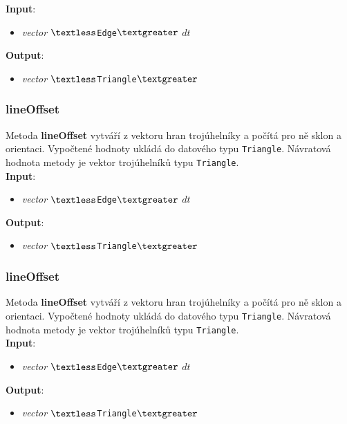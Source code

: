 \documentclass[a4paper, 12pt]{article}
\begin{document}
\textbf{Input}:
\begin{itemize}
\item \textsl{vector} $\textless$\texttt{Edge}$\textgreater$ $dt$
\end{itemize}

\textbf{Output}:
\begin{itemize}
\item \textsl{vector} $\textless$\texttt{Triangle}$\textgreater$
\end{itemize}

\subsubsection*{lineOffset}
Metoda \textbf{lineOffset} vytváří z vektoru hran trojúhelníky a počítá pro ně sklon a orientaci. Vypočtené hodnoty ukládá do datového typu \texttt{Triangle}. Návratová hodnota metody je vektor trojúhelníků typu \texttt{Triangle}.\\

\textbf{Input}:
\begin{itemize}
\item \textsl{vector} $\textless$\texttt{Edge}$\textgreater$ $dt$
\end{itemize}

\textbf{Output}:
\begin{itemize}
\item \textsl{vector} $\textless$\texttt{Triangle}$\textgreater$
\end{itemize}

\subsubsection*{lineOffset}
Metoda \textbf{lineOffset} vytváří z vektoru hran trojúhelníky a počítá pro ně sklon a orientaci. Vypočtené hodnoty ukládá do datového typu \texttt{Triangle}. Návratová hodnota metody je vektor trojúhelníků typu \texttt{Triangle}.\\

\textbf{Input}:
\begin{itemize}
\item \textsl{vector} $\textless$\texttt{Edge}$\textgreater$ $dt$
\end{itemize}

\textbf{Output}:
\begin{itemize}
\item \textsl{vector} $\textless$\texttt{Triangle}$\textgreater$
\end{itemize}
\end{document}
